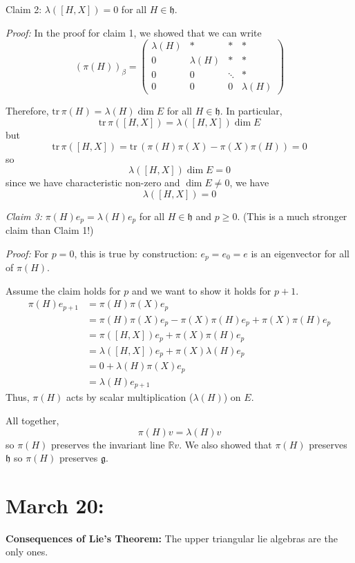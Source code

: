 \documentclass[12pt]{article}
\newcommand{\R}{\mathbb{R}}
\newcommand{\tr}{\text{tr}\,}
\newcommand{\g}{\mathfrak{g}}
\newcommand{\h}{\mathfrak{h}}
\newenvironment*{tbox}[2][gray]{
    \begin{tcolorbox}[
        parbox=false,
        colback=#1!5!white,
        colframe=#1!75!black,
        breakable,
        title={#2}
    ]}
    {\end{tcolorbox}}
\begin{document}
\begin{tbox}
        \emph{Claim 2:} $\lambda([H, X]) = 0$ for all $H \in \h$. 

        \emph{Proof:} In the proof for claim 1, we showed that we can write 
        \[(\pi(H))_{\beta} = \begin{pmatrix}
            \lambda(H) & * & * & * \\ 
            0 & \lambda(H) & * & *\\ 
            0 & 0 & \ddots & *\\ 
            0 & 0 & 0 & \lambda(H)
        \end{pmatrix}\] 

        Therefore, $\tr \pi(H) = \lambda(H) \dim E$ for all $H \in \h$. In particular, 
        \[\tr \pi([H, X]) = \lambda([H, X])\dim E\]
        but 
        \[\tr \pi([H, X]) = \tr (\pi(H)\pi(X) - \pi(X)\pi(H)) = 0\]
        so 
        \[\lambda([H, X])\dim E = 0\]
        since we have characteristic non-zero and $\dim E \neq 0$, we have 
        \[\lambda([H, X]) = 0\]

        \emph{Claim 3:} $\pi(H)e_p = \lambda(H)e_p$ for all $H \in \h$ and $p \geq 0$. (This is a much stronger claim than Claim 1!)

        \emph{Proof:} For $p = 0$, this is true by construction: $e_p = e_0 = e$ is an eigenvector for all of $\pi(H)$. 

        Assume the claim holds for $p$ and we want to show it holds for $p + 1$. 
        \begin{align*}
            \pi(H)e_{p+1} &= \pi(H)\pi(X)e_p\\ 
            &= \pi(H)\pi(X)e_p - \pi(X)\pi(H)e_p + \pi(X)\pi(H)e_p\\
            &= \pi([H, X])e_p + \pi(X)\pi(H)e_p\\
            &= \lambda([H, X])e_p  + \pi(X)\lambda(H)e_p\\ 
            &= 0 + \lambda(H) \pi(X) e_p\\
            &= \lambda(H)e_{p+1}
        \end{align*}
        Thus, $\pi(H)$ acts by scalar multiplication ($\lambda(H)$) on $E$. 
        
        All together, 
        \[\pi(H)v = \lambda(H)v\]
        so $\pi(H)$ preserves the invariant line $\R v$. We also showed that $\pi(H)$ preserves $\h$ so $\pi(H)$ preserves $\g$.  
    \end{tbox}

\section{March 20:}
    \textbf{Consequences of Lie's Theorem:} The upper triangular lie algebras are the only ones.  
        
\end{document}
